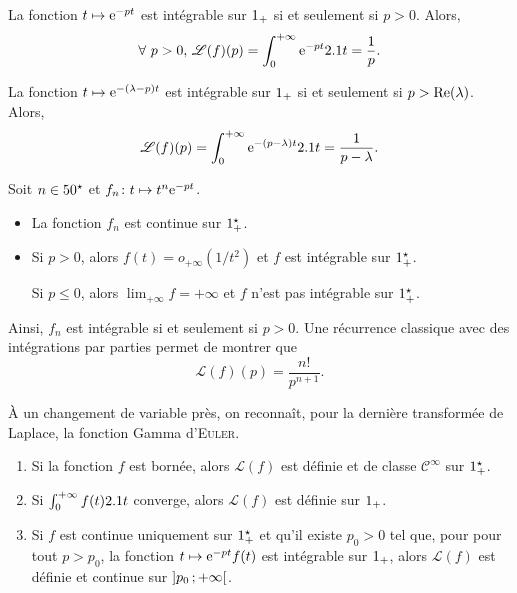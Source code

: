 \begin{solution}
\begin{reponses}
\item La fonction $t \mapsto \e^{-pt}$ est intégrable sur $\Rp$ si et seulement si $p > 0$. Alors,
\[
\forall\, p > 0,\,
\mathscr{L}(f)(p) = \int_0^{+\infty} \e^{-pt} \d t = \frac{1}{p}.
\]

\item La fonction $t \mapsto \e^{-(\lambda-p)t}$ est intégrable sur $\Rp$ si et seulement si $p > \Reel(\lambda)$. Alors,
\[
\mathscr{L}(f)(p)
= \int_0^{+\infty} \e^{-(p-\lambda)t} \d t
= \frac{1}{p-\lambda}.
\]

\item Soit $n \in \Ne$ et $\fonctionligne[f_n]{t}{t^n \e^{-pt}}$.
\begin{itemize}
\item La fonction $f_n$ est continue sur $\Rpe$.
\item Si $p > 0$, alors $f(t) = o_{+\infty}(1/t^2)$ et $f$ est intégrable sur $\Rpe$.

Si $p \leqslant 0$, alors $\lim_{+\infty} f = +\infty$ et $f$ n'est pas intégrable sur $\Rpe$.
\end{itemize}
Ainsi, $f_n$ est intégrable si et seulement si $p > 0$. Une récurrence classique avec des intégrations par parties permet de montrer que
\[
\mathscr{L}(f)(p) = \frac{n!}{p^{n+1}}.
\]
\end{reponses}
\end{solution}



\begin{remarque}
À un changement de variable près, on reconnaît, pour la dernière transformée de Laplace, la fonction Gamma d'\textsc{Euler}.
\end{remarque}


\begin{theo}
\begin{enumerate}
\item Si la fonction $f$ est bornée, alors $\mathscr{L}(f)$ est définie et de classe $\mathscr{C}^\infty$ sur $\Rpe$.

\item Si $\int_0^{+\infty} f(t) \d t$ converge, alors $\mathscr{L}(f)$ est définie sur $\Rp$.

\item Si $f$ est continue uniquement sur $\Rpe$ et qu'il existe $p_0 > 0$ tel que, pour pour tout $p > p_0$, la fonction $t \mapsto \e^{-p t} f(t)$ est intégrable sur $\Rp$, alors $\mathscr{L}(f)$ est définie et continue sur $\interoo{p_0}{+\infty}$.
\end{enumerate}
\end{theo}

